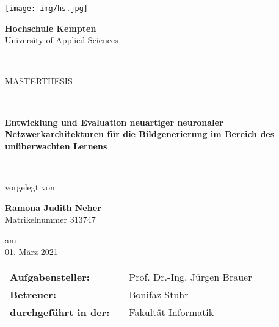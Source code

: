 

\thispagestyle{empty}
%


	\begin{titlepage}
	
				
				
				
				\begin{flushright}	
					\texttt{[image: img/hs.jpg]}
			
					\Large{\textbf{{Hochschule Kempten\\}}}
					\footnotesize{University of Applied Sciences \\}
				\end{flushright}
				
				
				
				~\\
				
				\begin{center}
					\LARGE{MASTERTHESIS}
				\end{center}
				~\\
				\begin{center}
					\textbf{\large{Entwicklung und Evaluation neuartiger neuronaler Netzwerkarchitekturen für die Bildgenerierung im Bereich des unüberwachten Lernens\\}}
				\end{center}
				
				~\\
				
				\begin{center}
					vorgelegt von
				\end{center}
				
				\begin{center}
					\large{\textbf{Ramona Judith Neher}} \\
					\large{Matrikelnummer 313747}
				\end{center}
				
				
				\begin{center}
					am\\
					\large{01. März 2021}
				\end{center}
				
				\hspace{15cm}
				
				\begin{center}
					\begin{tabular}{lll}
						\textbf{Aufgabensteller:} & & \hspace{4cm} Prof. Dr.-Ing. Jürgen Brauer\\
						
						\textbf{Betreuer:} & & \hspace{4cm} Bonifaz Stuhr\\
						[10pt]
						\textbf{durchgeführt in der:} & & \hspace{4cm} Fakultät Informatik \\[10pt]
					\end{tabular}
				\end{center}
				

	\end{titlepage}
%

